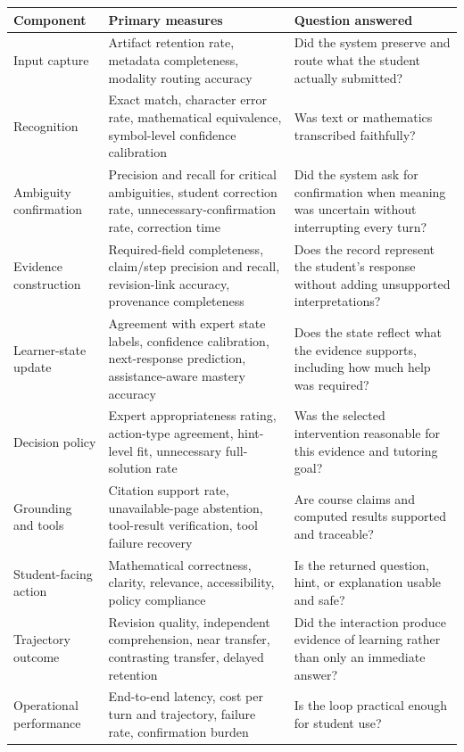 \documentclass[11pt]{article}
\begin{document}
\noindent\begin{tabularx}{\textwidth}{@{}p{}p{}X@{}}
\toprule
\textbf{Component} & \textbf{Primary measures} & \textbf{Question answered} \\
\midrule
Input capture & Artifact retention rate, metadata completeness, modality routing accuracy & Did the system preserve and route what the student actually submitted? \\
Recognition & Exact match, character error rate, mathematical equivalence, symbol-level confidence calibration & Was text or mathematics transcribed faithfully? \\
Ambiguity confirmation & Precision and recall for critical ambiguities, student correction rate, unnecessary-confirmation rate, correction time & Did the system ask for confirmation when meaning was uncertain without interrupting every turn? \\
Evidence construction & Required-field completeness, claim/step precision and recall, revision-link accuracy, provenance completeness & Does the record represent the student's response without adding unsupported interpretations? \\
Learner-state update & Agreement with expert state labels, confidence calibration, next-response prediction, assistance-aware mastery accuracy & Does the state reflect what the evidence supports, including how much help was required? \\
Decision policy & Expert appropriateness rating, action-type agreement, hint-level fit, unnecessary full-solution rate & Was the selected intervention reasonable for this evidence and tutoring goal? \\
Grounding and tools & Citation support rate, unavailable-page abstention, tool-result verification, tool failure recovery & Are course claims and computed results supported and traceable? \\
Student-facing action & Mathematical correctness, clarity, relevance, accessibility, policy compliance & Is the returned question, hint, or explanation usable and safe? \\
Trajectory outcome & Revision quality, independent comprehension, near transfer, contrasting transfer, delayed retention & Did the interaction produce evidence of learning rather than only an immediate answer? \\
Operational performance & End-to-end latency, cost per turn and trajectory, failure rate, confirmation burden & Is the loop practical enough for student use? \\
\bottomrule
\end{tabularx}
\end{document}
